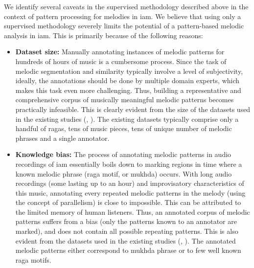 We identify several caveats in the supervised methodology described above in the context of pattern processing for melodies in \gls{iam}. We believe that using only a supervised methodology severely limits the potential of a pattern-based melodic analysis in \gls{iam}. This is primarily because of the following reasons:

\begin{itemize}
	\item \textbf{Dataset size:} Manually annotating instances of melodic patterns for hundreds of hours of music is a cumbersome process. Since the task of melodic segmentation and similarity typically involve a level of subjectivity, ideally, the annotations should be done by multiple domain experts, which makes this task even more challenging. Thus, building a representative and comprehensive corpus of musically meaningful melodic patterns becomes practically infeasible. This is clearly evident from the size of the datasets used in the existing studies (, ).  The existing datasets typically comprise only a handful of \glspl{raga}, tens of music pieces, tens of unique number of melodic phrases and a single annotator.

	\item \textbf{Knowledge bias:} The process of annotating melodic patterns in audio recordings of \gls{iam} essentially boils down to marking regions in time where a known melodic phrase (\gls{raga} motif, or \gls{mukhda}) occurs. With long audio recordings (some lasting up to an hour) and improvisatory characteristics of this music, annotating every repeated melodic patterns in the melody (using the concept of parallelism) is close to impossible. This can be attributed to the limited memory of human listeners. Thus, an annotated corpus of melodic patterns suffers from a bias (only the patterns known to an annotator are marked), and does not contain all possible repeating patterns. This is also evident from the datasets used in the existing studies (, ). The annotated melodic patterns either correspond to \gls{mukhda} phrase or to few well known \gls{raga} motifs. 
	

\end{itemize}

